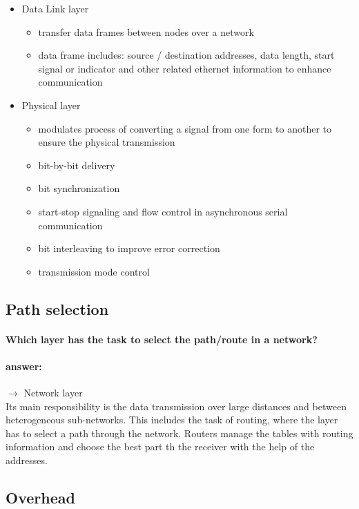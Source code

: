 \documentclass[a4paper,11pt]{article}
\begin{document}
\begin{itemize}
	\item Data Link layer
	\begin{itemize}
		\item  transfer data frames between nodes over a network
		\item  data frame includes: source / destination addresses, data length, start signal or indicator and other related ethernet information to enhance communication		 
	\end{itemize}

	\item Physical layer
	\begin{itemize}
		\item  modulates process of converting a signal from one form to another to ensure the physical transmission
		\item  bit-by-bit delivery
		\item  bit synchronization
		\item  start-stop signaling and flow control in asynchronous serial communication
		\item  bit interleaving to improve error correction
		\item  transmission mode control
	\end{itemize}

\end{itemize}
 
 \subsection{Path selection}
 \paragraph{Which layer has the task to select the path/route in a network?}
 \paragraph{answer:} 
 $\rightarrow$ Network layer \\
 Its main responsibility is the data transmission over large distances and between heterogeneous sub-networks. This includes the task of routing, where the layer has to select a path through the network. Routers manage the tables with routing information and choose the best part th the receiver with the help of the addresses. 
 
 \subsection{Overhead}
\end{document}
